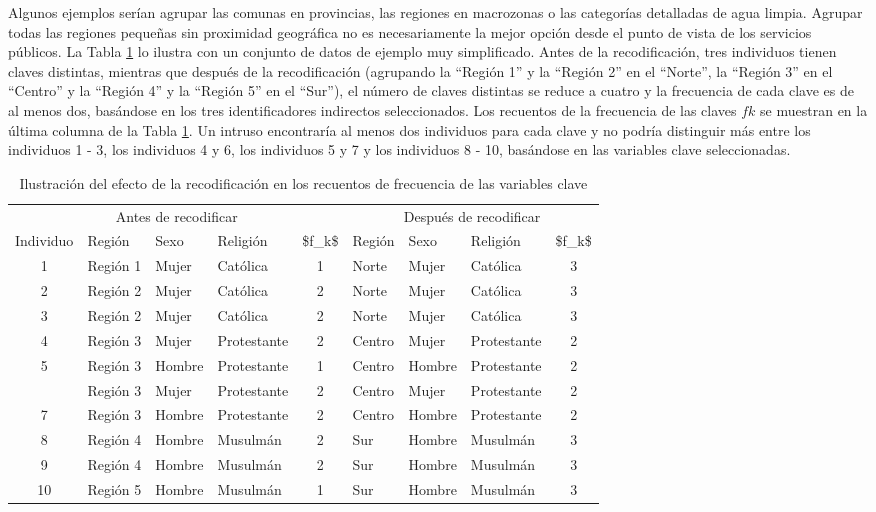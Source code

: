 \documentclass[]{book}
\theoremstyle{definition}
\theoremstyle{definition}
\theoremstyle{definition}
\theoremstyle{definition}
\theoremstyle{remark}
\begin{document}
Algunos ejemplos serían agrupar las comunas en provincias, las regiones en macrozonas o las categorías detalladas de agua limpia. Agrupar todas las regiones pequeñas sin proximidad geográfica no es necesariamente la mejor opción desde el punto de vista de los servicios públicos. La Tabla \ref{tab:Tabla7} lo ilustra con un conjunto de datos de ejemplo muy simplificado. Antes de la recodificación, tres individuos tienen claves distintas, mientras que después de la recodificación (agrupando la ``Región 1'' y la ``Región 2'' en el ``Norte'', la ``Región 3'' en el ``Centro'' y la ``Región 4'' y la ``Región 5'' en el ``Sur''), el número de claves distintas se reduce a cuatro y la frecuencia de cada clave es de al menos dos, basándose en los tres identificadores indirectos seleccionados. Los recuentos de la frecuencia de las claves \(fk\) se muestran en la última columna de la Tabla \ref{tab:Tabla7}. Un intruso encontraría al menos dos individuos para cada clave y no podría distinguir más entre los individuos 1 - 3, los individuos 4 y 6, los individuos 5 y 7 y los individuos 8 - 10, basándose en las variables clave seleccionadas.

\begin{table}

\caption{\label{tab:Tabla7}\label{tab:Tabla7}Ilustración del efecto de la recodificación en los recuentos de frecuencia de las variables clave}
\centering
\begin{tabular}[t]{clllclllc}
\toprule
\multicolumn{5}{c}{Antes de recodificar} & \multicolumn{4}{c}{Después de recodificar} \\
\cmidrule(l{3pt}r{3pt}){1-5} \cmidrule(l{3pt}r{3pt}){6-9}
Individuo & Región & Sexo & Religión & \$f\_k\$ & Región & Sexo & Religión & \$f\_k\$\\
\midrule
1 & Región 1 & Mujer & Católica & 1 & Norte & Mujer & Católica & 3\\
2 & Región 2 & Mujer & Católica & 2 & Norte & Mujer & Católica & 3\\
3 & Región 2 & Mujer & Católica & 2 & Norte & Mujer & Católica & 3\\
4 & Región 3 & Mujer & Protestante & 2 & Centro & Mujer & Protestante & 2\\
5 & Región 3 & Hombre & Protestante & 1 & Centro & Hombre & Protestante & 2\\
\addlinespace
6 & Región 3 & Mujer & Protestante & 2 & Centro & Mujer & Protestante & 2\\
7 & Región 3 & Hombre & Protestante & 2 & Centro & Hombre & Protestante & 2\\
8 & Región 4 & Hombre & Musulmán & 2 & Sur & Hombre & Musulmán & 3\\
9 & Región 4 & Hombre & Musulmán & 2 & Sur & Hombre & Musulmán & 3\\
10 & Región 5 & Hombre & Musulmán & 1 & Sur & Hombre & Musulmán & 3\\
\bottomrule
\end{tabular}
\end{table}
\end{document}
